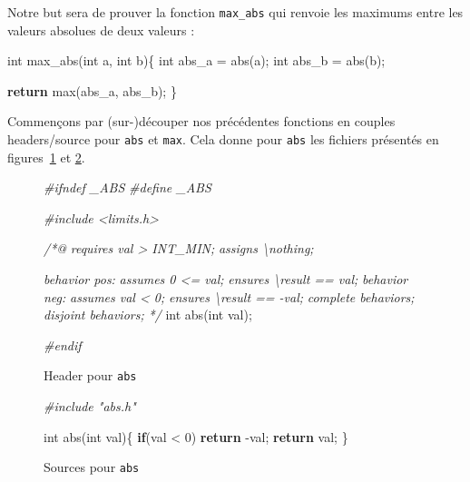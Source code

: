 \documentclass[12pt,francais,]{scrbook}
\newenvironment{Shaded}{}{}
\newcommand{\KeywordTok}[1]{\textcolor[rgb]{0.00,0.44,0.13}{\textbf{{#1}}}}
\newcommand{\DataTypeTok}[1]{\textcolor[rgb]{0.56,0.13,0.00}{{#1}}}
\newcommand{\DecValTok}[1]{\textcolor[rgb]{0.25,0.63,0.44}{{#1}}}
\newcommand{\CommentTok}[1]{\textcolor[rgb]{0.38,0.63,0.69}{\textit{{#1}}}}
\newcommand{\NormalTok}[1]{{#1}}
\begin{document}
Notre but sera de prouver la fonction \texttt{max\_abs} qui renvoie les
maximums entre les valeurs absolues de deux valeurs :

\begin{footnotesize}\begin{Shaded}
\begin{Highlighting}[]
\DataTypeTok{int} \NormalTok{max_abs(}\DataTypeTok{int} \NormalTok{a, }\DataTypeTok{int} \NormalTok{b)\{}
  \DataTypeTok{int} \NormalTok{abs_a = abs(a);}
  \DataTypeTok{int} \NormalTok{abs_b = abs(b);}

  \KeywordTok{return} \NormalTok{max(abs_a, abs_b);}
\NormalTok{\}}
\end{Highlighting}
\end{Shaded}\end{footnotesize}

Commençons par (sur-)découper nos précédentes fonctions en couples
headers/source pour \texttt{abs} et \texttt{max}. Cela donne pour
\texttt{abs} les fichiers présentés en figures~\ref{fig:3-4-hd} et
\ref{fig:3-4-src}.

\begin{figure}
  \centering
\begin{footnotesize}\begin{Shaded}
\begin{Highlighting}[]
\CommentTok{#ifndef _ABS}
\CommentTok{#define _ABS}

\CommentTok{#include <limits.h>}

\CommentTok{/*@}
\CommentTok{  requires val > INT_MIN;}
\CommentTok{  assigns  \textbackslash{}nothing;}

\CommentTok{  behavior pos:}
\CommentTok{    assumes 0 <= val;}
\CommentTok{    ensures \textbackslash{}result == val;}
\CommentTok{  }
\CommentTok{  behavior neg:}
\CommentTok{    assumes val < 0;}
\CommentTok{    ensures \textbackslash{}result == -val;}
\CommentTok{ }
\CommentTok{  complete behaviors;}
\CommentTok{  disjoint behaviors;}
\CommentTok{*/}
\DataTypeTok{int} \NormalTok{abs(}\DataTypeTok{int} \NormalTok{val);}

\CommentTok{#endif}
\end{Highlighting}
\end{Shaded}\end{footnotesize}
\caption{Header pour \texttt{abs}}
\label{fig:3-4-hd}
\end{figure}

\begin{figure}
  \centering
\begin{footnotesize}\begin{Shaded}
\begin{Highlighting}[]
\CommentTok{#include "abs.h"}

\DataTypeTok{int} \NormalTok{abs(}\DataTypeTok{int} \NormalTok{val)\{}
  \KeywordTok{if}\NormalTok{(val < }\DecValTok{0}\NormalTok{) }\KeywordTok{return} \NormalTok{-val;}
  \KeywordTok{return} \NormalTok{val;}
\NormalTok{\}}
\end{Highlighting}
\end{Shaded}\end{footnotesize}
\caption{Sources pour \texttt{abs}}
\label{fig:3-4-src}
\end{figure}
\end{document}
